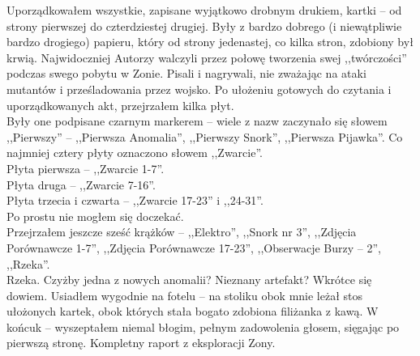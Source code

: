 \documentclass[../MAIN.tex]{subfiles}
\begin{document}
Uporządkowałem wszystkie, zapisane wyjątkowo drobnym drukiem, kartki -- od strony pierwszej do czterdziestej drugiej. Były z bardzo dobrego (i niewątpliwie bardzo drogiego) papieru, który od strony jedenastej, co kilka stron, zdobiony był krwią. Najwidoczniej Autorzy walczyli przez połowę tworzenia swej ,,twórczości'' podczas swego pobytu w Zonie. Pisali i nagrywali, nie zważając na ataki mutantów i prześladowania przez wojsko.
Po ułożeniu gotowych do czytania i uporządkowanych akt, przejrzałem kilka płyt.\\
Były one podpisane czarnym markerem -- wiele z nazw zaczynało się słowem ,,Pierwszy'' -- ,,Pierwsza Anomalia'', ,,Pierwszy Snork'', ,,Pierwsza Pijawka''. Co najmniej cztery płyty oznaczono słowem ,,Zwarcie''.\\
Płyta pierwsza -- ,,Zwarcie 1-7''.\\
Płyta druga -- ,,Zwarcie 7-16''.\\
Płyta trzecia i czwarta -- ,,Zwarcie 17-23'' i ,,24-31''.\\
Po prostu nie mogłem się doczekać.\\
Przejrzałem jeszcze sześć krążków -- ,,Elektro'', ,,Snork nr 3'', ,,Zdjęcia Porównawcze 1-7'', ,,Zdjęcia Porównawcze 17-23'', ,,Obserwacje Burzy -- 2'',\\ ,,Rzeka''.\\
Rzeka.
Czyżby jedna z nowych anomalii? Nieznany artefakt? Wkrótce się dowiem.
Usiadłem wygodnie na fotelu -- na stoliku obok mnie leżał stos ułożonych kartek, obok których stała bogato zdobiona filiżanka z kawą.
\sx W końcu\3k -- wyszeptałem niemal błogim, pełnym zadowolenia głosem, sięgając po pierwszą stronę.
\qd
Kompletny raport z eksploracji Zony.
\end{document}
